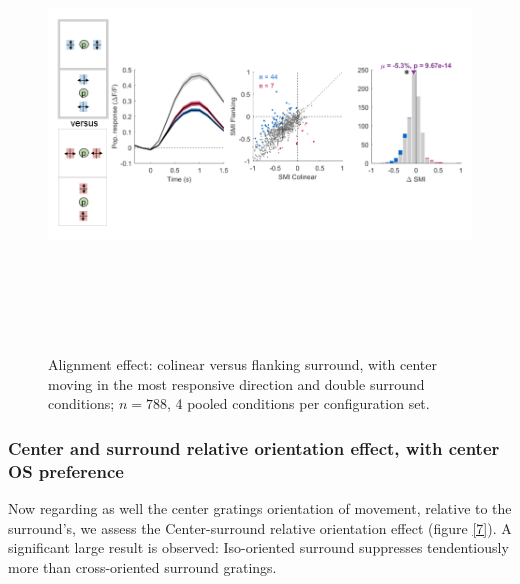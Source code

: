 \begin{figure}[H] \centering \includegraphics[width=12cm,height=12cm,keepaspectratio]{Figures/7.Results/finalPopulation/sel/diagrams/6.png} 
\caption{Alignment effect: colinear versus flanking surround, with center moving in the most responsive direction and double surround conditions;  $n=788$, 4 pooled conditions per configuration set.} 
\label{6}
\end{figure}

\subsubsection{Center and surround relative orientation effect, with center OS preference}

Now regarding as well the center gratings orientation of movement, relative to the surround's, we assess the Center-surround relative orientation effect (figure \ref{7}). A significant large result is observed: Iso-oriented surround suppresses tendentiously more than cross-oriented surround gratings.

